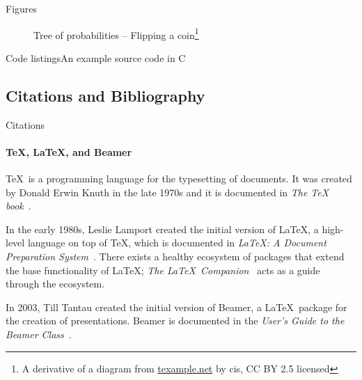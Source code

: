 \documentclass{beamer}
\begin{document}
\begin{darkframes}
\begin{frame}[label=figs2]{Figures}
\begin{figure}[b]
            \caption{Tree of probabilities -- Flipping a coin\footnote[frame]{%
               A derivative of a diagram from \url{texample.net} by cis, CC BY 2.5 licensed}}
         \end{figure} 

      \end{frame}


      \begin{frame}{Code listings}{An example source code in C}
         \sleepSort
      \end{frame}


      \subsection{Citations and Bibliography}
      \begin{frame}[label=citations]{Citations}
         \framesubtitle{\TeX, \LaTeX, and Beamer}

         \justifying\TeX\ is a programming language for the typesetting
         of documents. It was created by Donald Erwin Knuth in the late
         1970s and it is documented in \emph{The \TeX
         book}~\cite{knuth84}.

         In the early 1980s, Leslie Lamport created the initial version
         of \LaTeX, a high-level language on top of \TeX, which is
         documented in \emph{\LaTeX : A Document Preparation
         System}~\cite{lamport94}. There exists a healthy ecosystem of
         packages that extend the base functionality of \LaTeX;
         \emph{The \LaTeX\ Companion}~\cite{MG94} acts as a guide
         through the ecosystem.

         In 2003, Till Tantau created the initial version of Beamer, a
         \LaTeX\ package for the creation of presentations. Beamer is
         documented in the \emph{User's Guide to the Beamer
         Class}~\cite{tantau04}.
      \end{frame}


\end{darkframes}
\end{document}
